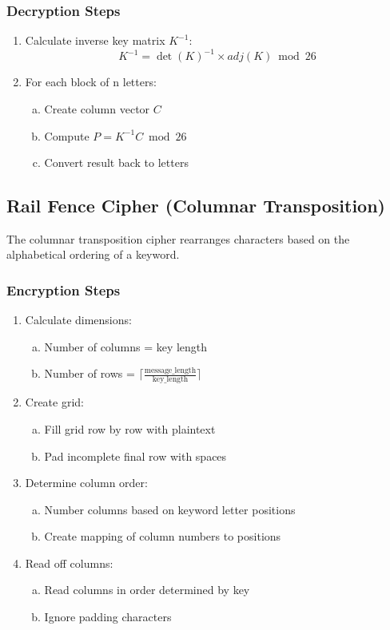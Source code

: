\documentclass[titlepage]{article}
\begin{document}
\subsubsection{ Decryption Steps}
\begin{enumerate}[1.]
\item Calculate inverse key matrix $K^{-1}$:
   \begin{equation}
   K^{-1} = \det(K)^{-1} \times adj(K) \bmod 26
   \end{equation}
\item For each block of n letters:
   \begin{enumerate}[a)]
   \item Create column vector $C$
   \item Compute $P = K^{-1}C \bmod 26$
   \item Convert result back to letters
   \end{enumerate}
\end{enumerate}

\subsection{Rail Fence Cipher (Columnar Transposition)}
The columnar transposition cipher rearranges characters based on the alphabetical ordering of a keyword.

\subsubsection{ Encryption Steps}
\begin{enumerate}[1.]
\item Calculate dimensions:
   \begin{enumerate}[a)]
   \item Number of columns = key length
   \item Number of rows = $\lceil\frac{\text{message\_length}}{\text{key\_length}}\rceil$
   \end{enumerate}
\item Create grid:
   \begin{enumerate}[a)]
   \item Fill grid row by row with plaintext
   \item Pad incomplete final row with spaces
   \end{enumerate}
\item Determine column order:
   \begin{enumerate}[a)]
   \item Number columns based on keyword letter positions
   \item Create mapping of column numbers to positions
   \end{enumerate}
\item Read off columns:
   \begin{enumerate}[a)]
   \item Read columns in order determined by key
   \item Ignore padding characters
   \end{enumerate}
\end{enumerate}
\end{document}
